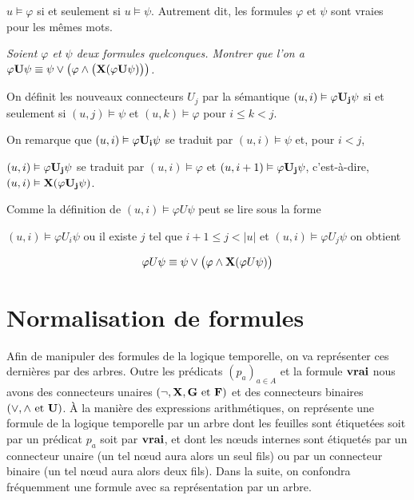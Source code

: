 $u\vDash \varphi$ si et seulement si $u\vDash \psi$. Autrement dit, les formules $\varphi$ et $\psi$ sont vraies pour les mêmes mots.
\begin{Exercise}\it
Soient $\varphi$ et $\psi$ deux formules quelconques. Montrer que l'on a $\varphi {\bf U} \psi \equiv \psi \vee  \bigl(\varphi \wedge  \bigl({\bf X}(\varphi {\bf U} \psi)\bigr)\bigr)$.
\end{Exercise}
\begin{Answer}
On définit les nouveaux connecteurs $U_j$ par la sémantique $(u,i) \vDash \varphi {\bf U_j} \psi$ si et seulement si $(u,j) \vDash \psi$ et $(u,k) \vDash \varphi$ pour $i\le k< j$.

On remarque que $(u,i) \vDash \varphi {\bf U_i} \psi$ se traduit par $(u,i) \vDash \psi$ et, pour $i <j$,

$(u,i) \vDash \varphi {\bf U_j} \psi$ se traduit par $(u,i) \vDash \varphi$ et $(u,i+1) \vDash \varphi {\bf U_j} \psi$, c'est-à-dire, $(u,i) \vDash {\bf X}(\varphi {\bf U_j} \psi)$.

\medskip

Comme la définition de $(u,i) \vDash \varphi U \psi$ peut se lire sous la forme

$(u,i) \vDash \varphi U_i \psi$ ou il existe $j$ tel que $i+1 \le j < |u|$ et $(u,i) \vDash \varphi U_j \psi$ on obtient

\[\varphi U \psi \equiv \psi \vee \bigl(\varphi \wedge {\bf X}(\varphi U \psi)\bigr)\]
\newpage
\end{Answer}
\section{Normalisation de formules}
Afin de manipuler des formules de la logique temporelle, on va représenter ces dernières par des arbres. Outre les prédicats $(p_a)_{a\in A}$ et la formule ${\bf vrai}$ nous avons des connecteurs unaires $(\neg, {\bf X}, {\bf G} \text{ et }{\bf F})$ et des connecteurs binaires $(\vee, \wedge \text{ et }{\bf U})$. À la manière des expressions arithmétiques, on représente une formule de la logique temporelle par un arbre dont les feuilles sont étiquetées soit par un prédicat $p_a$ soit par ${\bf vrai}$, et dont les nœuds internes sont étiquetés par un connecteur unaire (un tel nœud aura alors un seul fils) ou par un connecteur binaire (un tel nœud aura alors deux fils). Dans la suite, on confondra fréquemment une formule avec sa représentation par un arbre.

